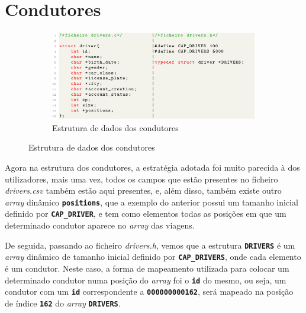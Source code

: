\documentclass[12pt,a4paper]{report}
\begin{document}
\vspace{-0.35cm}
\section{Condutores}

\begin{figure}[hbt!]
    \centering
    \begin{subfigure}{\textwidth}
        \centering
        \includegraphics[width=1\linewidth]{images/drivers.png}
        \caption*{Estrutura de dados dos condutores}
        \label{fig:drivers}
    \end{subfigure}
\end{figure}

Agora na estrutura dos condutores, a estratégia adotada foi muito parecida à dos utilizadores, mais uma vez, todos os campos que estão presentes no ficheiro \textit{drivers.csv} também estão aqui presentes, e, além disso, também existe outro \textit{array} dinâmico \textbf{\small\texttt{positions}}, que a exemplo do anterior possui um tamanho inicial definido por \textbf{\small\texttt{CAP\_DRIVER}}, e tem como elementos todas as posições em que um determinado condutor aparece no \textit{array} das viagens.

De seguida, passando ao ficheiro \textit{drivers.h}, vemos que a estrutura \textbf{\small\texttt{DRIVERS}} é um \textit{array} dinâmico de tamanho inicial definido por \textbf{\small\texttt{CAP\_DRIVERS}}, onde cada elemento é um condutor. Neste caso, a forma de mapeamento utilizada para colocar um determinado condutor numa posição do \textit{array} foi o \textbf{\small\texttt{id}} do mesmo, ou seja, um condutor com um \textbf{\small\texttt{id}} correspondente a \textbf{\small\texttt{000000000162}}, será mapeado na posição de índice \textbf{\small\texttt{162}} do \textit{array} \textbf{\small\texttt{DRIVERS}}.
\end{document}
